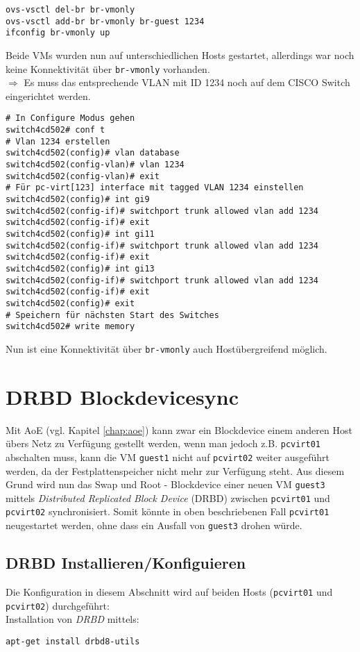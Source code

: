 \setupVerbatimOut
\begin{verbatim}
ovs-vsctl del-br br-vmonly
ovs-vsctl add-br br-vmonly br-guest 1234
ifconfig br-vmonly up
\end{verbatim}
Beide VMs wurden nun auf unterschiedlichen Hosts gestartet, allerdings war noch keine Kon\-nek\-tiv\-ität über \verb#br-vmonly# vorhanden.
\\
$\Rightarrow$ Es muss das entsprechende VLAN mit ID 1234 noch auf dem CISCO Switch eingerichtet werden.

\setupVerbatimOut
\begin{verbatim}
# In Configure Modus gehen
switch4cd502# conf t
# Vlan 1234 erstellen
switch4cd502(config)# vlan database 
switch4cd502(config-vlan)# vlan 1234
switch4cd502(config-vlan)# exit
# Für pc-virt[123] interface mit tagged VLAN 1234 einstellen 
switch4cd502(config)# int gi9 
switch4cd502(config-if)# switchport trunk allowed vlan add 1234
switch4cd502(config-if)# exit
switch4cd502(config)# int gi11
switch4cd502(config-if)# switchport trunk allowed vlan add 1234
switch4cd502(config-if)# exit
switch4cd502(config)# int gi13
switch4cd502(config-if)# switchport trunk allowed vlan add 1234
switch4cd502(config-if)# exit
switch4cd502(config)# exit
# Speichern für nächsten Start des Switches
switch4cd502# write memory
\end{verbatim}

Nun ist eine Konnektivität über \verb#br-vmonly# auch Hostübergreifend möglich.

\chapter{DRBD Blockdevicesync}

Mit AoE (vgl. Kapitel \ref{chap:aoe}) kann zwar ein Blockdevice einem anderen Host übers Netz zu Verfügung gestellt werden, wenn man jedoch z.B. \verb#pcvirt01# abschalten muss, kann die VM \verb#guest1# nicht auf \verb#pcvirt02# weiter ausgeführt werden, da der Festplattenspeicher nicht mehr zur Verfügung steht. Aus diesem Grund wird nun das Swap und Root - Blockdevice einer neuen VM \verb#guest3# mittels \emph{Distributed Replicated Block Device} (DRBD) zwischen \verb#pcvirt01# und \verb#pcvirt02# synchronisiert. Somit könnte in oben beschriebenen Fall \verb#pcvirt01# neugestartet werden, ohne dass ein Ausfall von \verb#guest3# drohen würde.

\section{DRBD Installieren/Konfiguieren}
Die Konfiguration in diesem Abschnitt wird auf beiden Hosts (\verb#pcvirt01# und \verb#pcvirt02#) durchgeführt: 
\\
Installation von \emph{DRBD} mittels: 
\setupVerbatimOut
\begin{verbatim}
apt-get install drbd8-utils
\end{verbatim}

